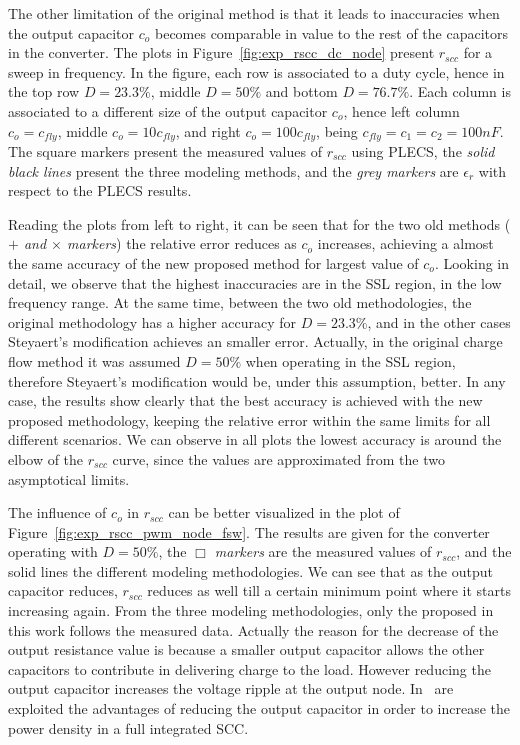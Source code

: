 The other limitation of the original method is that it leads to inaccuracies when the output capacitor $c_o$ becomes comparable in value to the rest of the capacitors in the converter. The plots in Figure~\ref{fig:exp_rscc_dc_node} present $r_{scc}$ for a sweep in frequency. In the figure, each row is associated to a duty cycle, hence in the top row $D=23.3\%$, middle $D=50\%$ and bottom $D=76.7\%$. Each column is associated to a different size of the output capacitor $c_o$, hence left column $c_o=c_{fly}$, middle $c_o=10c_{fly}$, and right $c_o=100c_{fly}$, being $c_{fly}=c_1=c_2 =100nF$. The square markers present the measured values of $r_{scc}$ using PLECS, the \emph{solid black lines} present the three modeling methods, and the \emph{grey markers} are $\epsilon_r$ with respect to the PLECS results.

Reading the plots from left to right, it can be seen that for the two old methods (\emph{$+$ and $\times$ markers}) the relative error reduces as $c_o$ increases, achieving a almost the same accuracy of the new proposed method for largest value of $c_o$. Looking in detail, we observe that the highest inaccuracies are in the SSL region, in the low frequency range. At the same time, between the two old methodologies, the original methodology has a higher accuracy for $D=23.3\%$, and in the other cases Steyaert's modification achieves an smaller error. Actually, in the original charge flow method it was assumed $D=50\%$ when operating in the SSL region, therefore Steyaert's modification would be, under this assumption, better. In any case, the results show clearly that the best accuracy is achieved with the new proposed methodology, keeping the relative error within the same limits for all different scenarios. We can observe in all plots the lowest accuracy is around the elbow of the $r_{scc}$ curve, since the values are approximated from the two asymptotical limits.


The influence of $c_o$ in $r_{scc}$ can be better visualized in the plot of  Figure~\ref{fig:exp_rscc_pwm_node_fsw}. The results are given for the converter operating with $D=50\%$, the \emph{$\Box$ markers} are the measured values of $r_{scc}$, and the solid lines the different modeling methodologies. We can see that as the output capacitor reduces, $r_{scc}$ reduces as well till a certain minimum point where it starts increasing again. From the three modeling methodologies, only the  proposed in this work follows the measured data. Actually the reason for the decrease of the output resistance value is because a smaller output capacitor allows the other capacitors to contribute in delivering charge to the load. However reducing the output capacitor increases the voltage ripple at the output node. In~\cite{14Andersen} are exploited the advantages of reducing the output capacitor in order to increase the power density in a full integrated SCC.

